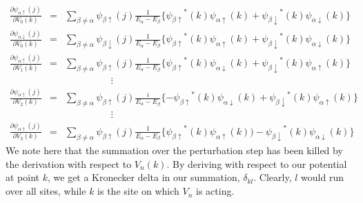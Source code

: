 \documentclass[10pt]{revtex4-1}
\newcommand{\ua}{\uparrow}
\newcommand{\da}{\downarrow}
\newcommand{\paup}{{\psi_{\alpha \ua}}}
\newcommand{\padn}{{\psi_{\alpha \da}}}
\newcommand{\pbup}{{\psi_{\beta \ua}}}
\newcommand{\pbdn}{{\psi_{\beta \da}}}
\begin{document}
\begin{eqnarray}
  \nonumber
  \frac{\partial \paup(j)}{\partial V_0(k)} & = & \sum_{\beta \neq \alpha} \pbup(j) \frac{1}{E_{\alpha}-E_{\beta}} \{ \pbup^*(k) \paup(k) + \pbdn^*(k) \padn(k) \} \\
  \nonumber
  \frac{\partial \padn(j)}{\partial V_0(k)} &=& \sum_{\beta \neq \alpha} \pbdn(j) \frac{1}{E_{\alpha}-E_{\beta}} \{ \pbup^*(k) \paup(k) + \pbdn^*(k) \padn(k) \} \\
  \nonumber
  \frac{\partial \paup(j)}{\partial V_1(k)} &=& \sum_{\beta \neq \alpha} \pbup(j) \frac{1}{E_{\alpha}-E_{\beta}} \{ \pbup^*(k) \padn(k) + \pbdn^*(k) \paup(k) \} \\
  \nonumber
   & & \hspace{2cm}\vdots  \\
  \nonumber
  \frac{\partial \paup(j)}{\partial V_2(k)} &=& \sum_{\beta \neq \alpha} \pbup(j) \frac{i}{E_{\alpha}-E_{\beta}} \{ -\pbup^*(k) \padn(k) + \pbdn^*(k) \paup(k) \} \\
  \nonumber
  & & \hspace{2cm}\vdots  \\
  \nonumber
  \frac{\partial \paup(j)}{\partial V_3(k)} &=& \sum_{\beta \neq \alpha} \pbup(j) \frac{1}{E_{\alpha}-E_{\beta}} \{ \pbup^*(k) \paup(k)) - \pbdn^*(k) \padn(k) \}
\end{eqnarray}
We note here that the summation over the perturbation step has been killed by the derivation with respect to $V_n(k)$.
By deriving with respect to our potential at point $k$, we get a Kronecker delta in our summation, $\delta_{kl}$.
Clearly, $l$ would run over all sites, while $k$ is the site on which $V_n$ is acting.
\end{document}
